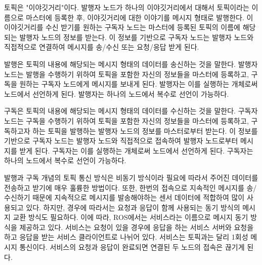 \vspace{\baselineskip}
\begin{definition}[토픽(topic)]\label{def:RosTopic}
토픽은 "이야깃거리"이다. 발행자 노드가 하나의 이야깃거리에서 대해서 토픽이라는 이름으로 마스터에 등록한 후, 이야깃거리에 대한 이야기를 메시지 형태로 발행한다. 이 이야깃거리를 수신 받기를 원하는 구독자 노드는 마스터에 등록된 토픽의 이름에 해당되는 발행자 노드의 정보를 받는다. 이 정보를 기반으로 구독자 노드는 발행자 노드와 직접적으로 연결하여 메시지를 송/수신 또는 요청/응답 받게 된다. 
\end{definition}

\vspace{\baselineskip}
\begin{definition}\label{def:RosPublish}
발행은 토픽의 내용에 해당되는 메시지 형태의 데이터를 송신하는 것을 말한다. 발행자 노드는 발행을 수행하기 위하여 토픽을 포함한 자신의 정보들을 마스터에 등록하고, 구독을 원하는 구독자 노드에게 메시지를 보내게 된다. 발행자는 이를 실행하는 개체로써 노드에서 선언하게 된다. 발행자는 하나의 노드에서 복수로 선언이 가능하다.
\end{definition}

\vspace{\baselineskip}
\begin{definition}\label{def:RosSubscribe}
구독은 토픽의 내용에 해당되는 메시지 형태의 데이터를 수신하는 것을 말한다. 구독자 노드는 구독을 수행하기 위하여 토픽을 포함한 자신의 정보들을 마스터에 등록하고, 구독하고자 하는 토픽을 발행하는 발행자 노드의 정보를 마스터로부터 받는다. 이 정보를 기반으로 구독자 노드는 발행자 노드와 직접적으로 접속하여 발행자 노드로부터 메시지를 받게 된다. 구독자는 이를 실행하는 개체로써 노드에서 선언하게 된다. 구독자는 하나의 노드에서 복수로 선언이 가능하다.
\end{definition}

\vspace{\baselineskip}
\begin{definition}\label{def:RosService}
발행과 구독 개념의 토픽 통신 방식은 비동기 방식이라 필요에 따라서 주어진 데이터를 전송하고 받기에 매우 훌륭한 방법이다. 또한, 한번의 접속으로 지속적인 메시지를 송/수신하기 때문에 지속적으로 메시지를 발송해야하는 센서 데이터에 적합하여 많이 사용되고 있다. 하지만, 경우에 따라서는 요청과 응답이 함께 사용되는 동기 방식의 메시지 교환 방식도 필요하다. 이에 따라, ROS에서는 서비스라는 이름으로 메시지 동기 방식을 제공하고 있다. 서비스는 요청이 있을 경우에 응답을 하는 서비스 서버와 요청을 하고 응답을 받는 서비스 클라이언트로 나뉘어 있다. 서비스는 토픽과는 달리 1회성 메시지 통신이다. 서비스의 요청과 응답이 완료되면 연결된 두 노드의 접속은 끊기게 된다. 
\end{definition}

